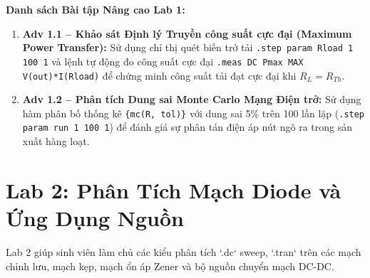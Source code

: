 \documentclass[12pt,a4paper]{report}
\begin{document}
\textbf{Danh sách Bài tập Nâng cao Lab 1:}
\begin{enumerate}
    \item \textbf{Adv 1.1 -- Khảo sát Định lý Truyền công suất cực đại (Maximum Power Transfer):} Sử dụng chỉ thị quét biến trở tải \lstinline|.step param Rload 1 100 1| và lệnh tự động đo công suất cực đại \lstinline|.meas DC Pmax MAX V(out)*I(Rload)| để chứng minh công suất tải đạt cực đại khi $R_L = R_{Th}$.
    \item \textbf{Adv 1.2 -- Phân tích Dung sai Monte Carlo Mạng Điện trở:} Sử dụng hàm phân bố thống kê \lstinline|{mc(R, tol)}| với dung sai 5\% trên 100 lần lặp (\lstinline|.step param run 1 100 1|) để đánh giá sự phân tán điện áp nút ngõ ra trong sản xuất hàng loạt.
\end{enumerate}

\section{Lab 2: Phân Tích Mạch Diode và Ứng Dụng Nguồn}
Lab 2 giúp sinh viên làm chủ các kiểu phân tích `.dc` sweep, `.tran` trên các mạch chỉnh lưu, mạch kẹp, mạch ổn áp Zener và bộ nguồn chuyển mạch DC-DC.
\end{document}
